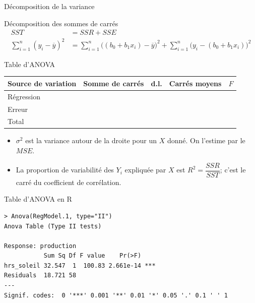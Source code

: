 \documentclass{BeamerTemplate}
\begin{document}
\begin{frame}[t]{Décomposition de la variance}

\begin{Boite}{Décomposition des sommes de carrés}
\begin{align*}
SST &= SSR + SSE\\
\sum_{i=1}^{n}(y_i-\overline{y})^2
&= \sum_{i=1}^{n}\bigl((b_0+b_1x_i)-\overline{y}\bigr)^2
 + \sum_{i=1}^{n}\bigl(y_i-(b_0+b_1x_i)\bigr)^2
\end{align*}
\end{Boite}

\end{frame}

\begin{frame}[t]{Table d'ANOVA}

\begin{center}
\renewcommand{\arraystretch}{1.9}
\begin{tabular}{lcccc}
\toprule
Source de variation & Somme de carrés & d.l. & Carrés moyens & $F$\\
\midrule
Régression & \hspace{1.5cm} & \hspace{1cm} & \hspace{1.8cm} & \hspace{1.2cm}\\
Erreur     & & & & \\
\midrule
Total      & & & & \\
\bottomrule
\end{tabular}
\end{center}

\begin{itemize}\itemsep1mm
  \item $\sigma^2$ est la variance autour de la droite pour un $X$ donné. On
  l'estime par le $MSE$.
  \item La proportion de variabilité des $Y_i$ expliquée par $X$ est
  $R^2=\dfrac{SSR}{SST}$; c'est le carré du coefficient de corrélation.
\end{itemize}

\end{frame}

\begin{frame}[fragile,t]{Table d'ANOVA en R}

\begin{Verbatim}[fontsize=\small]
> Anova(RegModel.1, type="II")
Anova Table (Type II tests)

Response: production
           Sum Sq Df F value    Pr(>F)
hrs_soleil 32.547  1  100.83 2.661e-14 ***
Residuals  18.721 58
---
Signif. codes:  0 '***' 0.001 '**' 0.01 '*' 0.05 '.' 0.1 ' ' 1
\end{Verbatim}

\end{frame}
\end{document}
